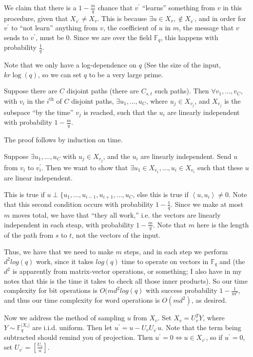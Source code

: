 \documentclass[11pt]{article}
\newcommand{\F}{\mathbb{F}}
\begin{document}
We claim that there is a $1 - \frac{m}{q}$ chance that $v^\prime$ ``learns'' something from $v$ in this
procedure, given that $X_{v^\prime} \neq X_v$. This is because $\exists u\in X_v, \notin X_{v^\prime}$,
and in order for $v^\prime$ to ``not learn'' anything from $v$, the coefficient of $u$ in $m$, the message 
that $v$ sends to $v^\prime$, must be 0. Since we are over the field $\F_q$, this happens with probability
$\frac{1}{q}$.

Note that we only have a log-dependence on $q$ (See the size of the input, $kr\log(q)$, so we can set 
$q$ to be a very large prime.

Suppose there are $C$ disjoint paths (there are $C_{s,t}$ such paths). Then $\forall v_1, \ldots, v_C$,
with $v_i$ in the $i^{\text{th}}$ of $C$ disjoint paths, $\exists u_1, \ldots, u_C$, where $u_j \in X_{v_j}$,
and $X_{v_j}$ is the subspace ``by the time'' $v_j$ is reached, such that the $u_i$ are linearly independent
with probability $1 - \frac{m}{q}$.

The proof follows by induction on time. 

Suppose $\exists u_1, \ldots, u_C$ with $u_j \in X_{v_j}$, and the $u_i$ are linearly independent. 
Send $u$ from $v_i$ to $v_i^\prime$. Then we want to show that $\exists u_1 \in X_{v_1}, \ldots, u_i \in
X_{v_i}$ such that these $u$ are linear independent. 

This is true if $u \perp \{u_1, \ldots, u_{i-1}, u_{i+1}, \ldots, u_C$, else this is true if
$\left<u, u_i\right> \neq 0$. Note that this second condition occurs with probability $1 - \frac{1}{q}$.
Since we make at most $m$ moves total, we have that ``they all work,'' i.e. the vectors are linearly 
independent in each steap, with probability $1 - \frac{m}{q}$. Note that $m$ here is the length of the
path from $s$ to $t$, not the vectors of the input.

Thus, we have that we need to make $m$ steps, and in each step we perform $d^2log(q)$ work, since it 
takes $log(q)$ time to operate on vectors in $\F_q$ and (the $d^2$ is apparently from matrix-vector operations,
or something; I also have in my notes that this is the time it takes to check all those inner products).
So our time complexity for bit operations is $O(md^2log(q)$ with success probability $1 - \frac{1}{m^c}$,
and thus our time complexity for word operations is $O(md^2)$, as desired.

Now we address the method of sampling $u$ from $X_v$. Set $X_v = U_v^TY$, where $Y \sim \F_q^{|X_v|}$ are 
i.i.d. uniform. Then let $u^\prime = u - U_vU_{v^\prime}u$. Note that the term being subtracted should
remind you of projection. Then $u^\prime = 0 \iff u \in X_{v^\prime}$, so if $u^\prime = 0$, set 
$U_{v^\prime} = \left[\frac{U_v}{u}\right]$. 
\end{document}
